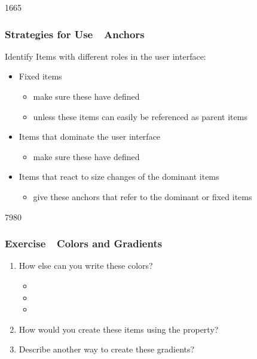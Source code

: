\begin{slide}{1665}
\frametitle{Strategies for Use~\textendash~Anchors}

Identify Items with different roles in the user interface:

\begin{itemize}
\item Fixed items
  \begin{itemize}
  \item make sure these have  defined
  \item unless these items can easily be referenced as parent items
  \end{itemize}
\item Items that dominate the user interface
  \begin{itemize}
  \item make sure these have  defined
  \end{itemize}
\item Items that react to size changes of the dominant items
  \begin{itemize}
  \item give these anchors that refer to the dominant or fixed items
  \end{itemize}
\end{itemize}

\end{slide}      

\begin{slide}{7980}
\frametitle{Exercise~\textendash~Colors and Gradients}

\begin{enumerate}
\item How else can you write these colors?
  \begin{itemize}
  \item {} %
  \item {} %
  \item {}
  \end{itemize}
\item How would you create these items using the  property?\\
\item Describe another way to create these gradients?
\end{enumerate}

\end{slide}

